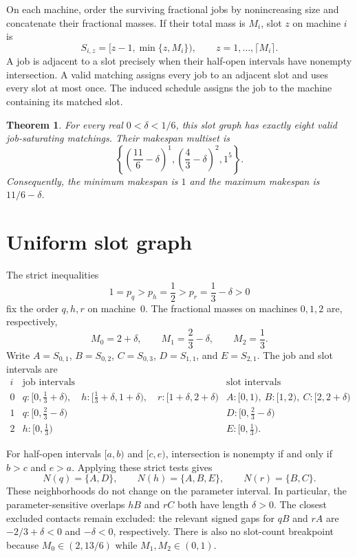 \documentclass[11pt]{article}
\newtheorem{theorem}{Theorem}
\begin{document}
On each machine, order the surviving fractional jobs by nonincreasing size and
concatenate their fractional masses.  If their total mass is $M_i$, slot $z$
on machine $i$ is
\[
 S_{i,z}=[z-1,\min\{z,M_i\}),
 \qquad z=1,\ldots,\lceil M_i\rceil.
\]
A job is adjacent to a slot precisely when their half-open intervals have
nonempty intersection.  A valid matching assigns every job to an adjacent
slot and uses every slot at most once.  The induced schedule assigns the job
to the machine containing its matched slot.

\begin{theorem}\label{thm:spectrum}
For every real $0<\delta<1/6$, this slot graph has exactly eight valid
job-saturating matchings.  Their makespan multiset is
\[
 \left\{\left(\frac{11}{6}-\delta\right)^1,
 \left(\frac43-\delta\right)^2,1^5\right\}.
\]
Consequently, the minimum makespan is $1$ and the maximum makespan is
$11/6-\delta$.
\end{theorem}

\section{Uniform slot graph}

The strict inequalities
\[
 1=p_q>p_h=\frac12>p_r=\frac13-\delta>0
\]
fix the order $q,h,r$ on machine~0.  The fractional masses on machines
$0,1,2$ are, respectively,
\[
 M_0=2+\delta,\qquad M_1=\frac23-\delta,
 \qquad M_2=\frac13.
\]
Write $A=S_{0,1}$, $B=S_{0,2}$, $C=S_{0,3}$,
$D=S_{1,1}$, and $E=S_{2,1}$.  The job and slot intervals are
\[
\begin{array}{c|c|c}
i&\text{job intervals}&\text{slot intervals}\\ \hline
0&q:[0,\frac13+\delta),\quad
  h:[\frac13+\delta,1+\delta),\quad
  r:[1+\delta,2+\delta)
 &A:[0,1),\ B:[1,2),\ C:[2,2+\delta)\\[2pt]
1&q:[0,\frac23-\delta)&D:[0,\frac23-\delta)\\[2pt]
2&h:[0,\frac13)&E:[0,\frac13).
\end{array}
\]

For half-open intervals $[a,b)$ and $[c,e)$, intersection is nonempty if and
only if $b>c$ and $e>a$.  Applying these strict tests gives
\begin{equation}\label{eq:neighborhoods}
 N(q)=\{A,D\},\qquad N(h)=\{A,B,E\},\qquad
 N(r)=\{B,C\}.
\end{equation}
These neighborhoods do not change on the parameter interval.  In particular,
the parameter-sensitive overlaps $hB$ and $rC$ both have length $\delta>0$.
The closest excluded contacts remain excluded: the relevant signed gaps for
$qB$ and $rA$ are $-2/3+\delta<0$ and $-\delta<0$, respectively.  There is
also no slot-count breakpoint because $M_0\in(2,13/6)$ while $M_1,M_2\in(0,1)$.
\end{document}
